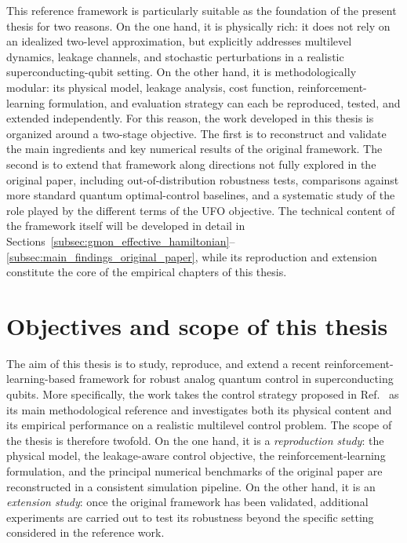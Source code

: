This reference framework is particularly suitable as the foundation of the present thesis for two reasons. On the one hand, it is physically rich: it does not rely on an idealized two-level approximation, but explicitly addresses multilevel dynamics, leakage channels, and stochastic perturbations in a realistic superconducting-qubit setting. On the other hand, it is methodologically modular: its physical model, leakage analysis, cost function, reinforcement-learning formulation, and evaluation strategy can each be reproduced, tested, and extended independently. For this reason, the work developed in this thesis is organized around a two-stage objective. The first is to reconstruct and validate the main ingredients and key numerical results of the original framework. The second is to extend that framework along directions not fully explored in the original paper, including out-of-distribution robustness tests, comparisons against more standard quantum optimal-control baselines, and a systematic study of the role played by the different terms of the UFO objective. The technical content of the framework itself will be developed in detail in Sections~\ref{subsec:gmon_effective_hamiltonian}--\ref{subsec:main_findings_original_paper}, while its reproduction and extension constitute the core of the empirical chapters of this thesis.


\section{Objectives and scope of this thesis}
\label{subsec:intro_objectives_scope}

The aim of this thesis is to study, reproduce, and extend a recent reinforcement-learning-based framework for robust analog quantum control in superconducting qubits. More specifically, the work takes the control strategy proposed in Ref.~\cite{Niu2019} as its main methodological reference and investigates both its physical content and its empirical performance on a realistic multilevel control problem. The scope of the thesis is therefore twofold. On the one hand, it is a \emph{reproduction study}: the physical model, the leakage-aware control objective, the reinforcement-learning formulation, and the principal numerical benchmarks of the original paper are reconstructed in a consistent simulation pipeline. On the other hand, it is an \emph{extension study}: once the original framework has been validated, additional experiments are carried out to test its robustness beyond the specific setting considered in the reference work.

